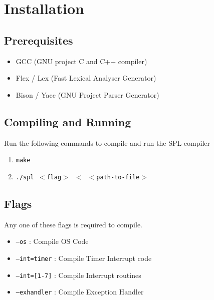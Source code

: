 \documentclass[11pt]{report}
\begin{document}
\section{Installation}

\subsection{Prerequisites}
\begin{itemize}
	\item GCC  (GNU project C and C++ compiler)
	\item Flex / Lex  (Fast Lexical Analyser Generator)
	\item Bison / Yacc  (GNU Project Parser Generator)
\end{itemize} 


\subsection{Compiling and Running}
Run the following commands to compile and run the SPL compiler
\begin{enumerate}
		\item \texttt{make}
		\item \texttt{./spl $<$flag$>$ $<$ $<$path-to-file$>$ }
\end{enumerate}

\subsection{Flags}
Any one of these flags is required to compile.
\begin{itemize}
	\item \texttt{--os} : Compile OS Code
	\item \texttt{--int=timer} : Compile Timer Interrupt code
	\item \texttt{--int=[1-7]} : Compile Interrupt routines
	\item \texttt{--exhandler} : Compile Exception Handler
\end{itemize}
\end{document}

